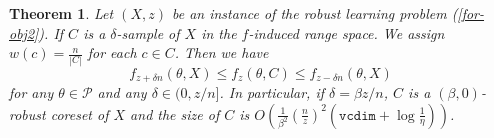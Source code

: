 \documentclass{article}
\newtheorem{theorem}{Theorem}
\begin{document}
\begin{theorem}\label{lemma-eps-sample}
Let $(X,z)$ be an instance of the robust  learning problem (\ref{for-obj2}). 
	If $ C $ is a $ \delta $-sample of $ X $ in  the $f$-induced range space. We assign $w(c)=\frac{n}{|C|}$ for each $c\in C$. Then we have 
	\begin{equation}
		f_{z+\delta n}(\theta,X)\leq
		f_{z}(\theta,C)\leq f_{z-\delta n}(\theta,X) \label{for-the-uniform}
	\end{equation}
	for any $ \theta\in\mathcal{P} $ and any $ \delta \in (0,z/n] $. In particular, if $\delta=\beta z/n$, $C$ is a $(\beta,0) $-robust coreset of $X$ and the size of $C$ is $O(\frac{1}{\beta^2}(\frac{n}{z})^2(\mathtt{vcdim}+\log \frac{1}{\eta}))$.  
\end{theorem}
\end{document}
